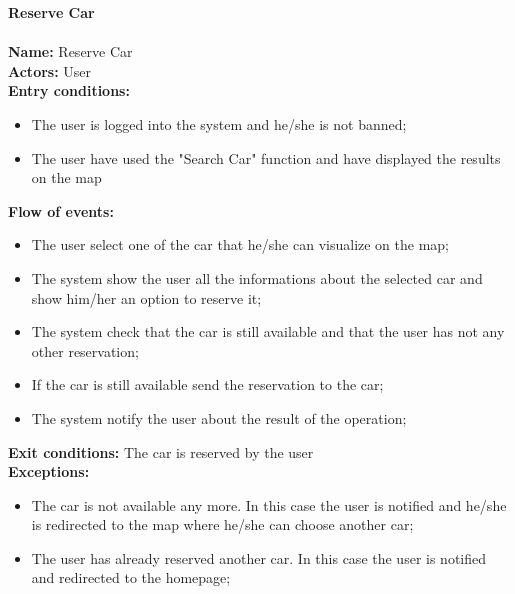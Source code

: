 \textbf{Reserve Car}\\
\\
\textbf{Name:} Reserve Car\\
\textbf{Actors:} User\\
\textbf{Entry conditions:}
 \begin{itemize}
\item The user is logged into the system and he/she is not banned;
\item The user have used the "Search Car" function and have displayed the results on the map
\end{itemize}
\textbf{Flow of events:}
\begin{itemize}
\item The user select one of the car that he/she can visualize on the map;
\item The system show the user all the informations about the selected car and show him/her an option to reserve it;
\item The system check that the car is still available and that the user has not any other reservation;
\item If the car is still available send the reservation to the car;
\item The system notify the user about the result of the operation;
\end{itemize}
\textbf{Exit conditions:} The car is reserved by the user  \\
\textbf{Exceptions:}
\begin{itemize}
\item The car is not available any more. In this case the user is notified and he/she is redirected to the map where he/she can choose another car;
\item The user has already reserved another car. In this case the user is notified and redirected to the homepage;
\end{itemize}


